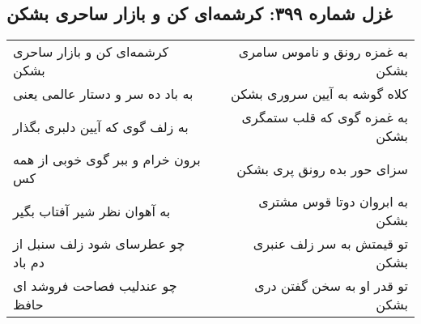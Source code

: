 \begin{center}
\section*{غزل شماره ۳۹۹: کرشمه‌ای کن و بازار ساحری بشکن}
\label{sec:sh399}
\begin{longtable}{l p{0.5cm} r}
کرشمه‌ای کن و بازار ساحری بشکن
&&
به غمزه رونق و ناموس سامری بشکن
\\
به باد ده سر و دستار عالمی یعنی
&&
کلاه گوشه به آیین سروری بشکن
\\
به زلف گوی که آیین دلبری بگذار
&&
به غمزه گوی که قلب ستمگری بشکن
\\
برون خرام و ببر گوی خوبی از همه کس
&&
سزای حور بده رونق پری بشکن
\\
به آهوان نظر شیر آفتاب بگیر
&&
به ابروان دوتا قوس مشتری بشکن
\\
چو عطرسای شود زلف سنبل از دم باد
&&
تو قیمتش به سر زلف عنبری بشکن
\\
چو عندلیب فصاحت فروشد ای حافظ
&&
تو قدر او به سخن گفتن دری بشکن
\\
\end{longtable}
\end{center}
